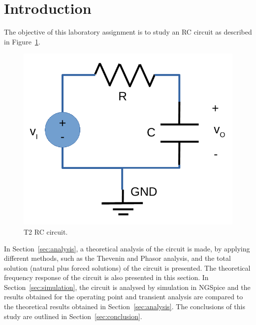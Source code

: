 \section{Introduction}
\label{sec:introduction}


The objective of this laboratory assignment is to study an RC circuit as described in Figure~\ref{fig:rc}.


\begin{figure}[h]
\centering
\includegraphics[width=0.4\linewidth]{../doc/rc.pdf}
\caption{T2 RC circuit.}
\label{fig:rc}
\end{figure}


In Section~\ref{sec:analysis}, a theoretical analysis of the circuit is made, by applying different methods, such as the Thevenin and Phasor analysis, and the total solution (natural plus forced solutions) of the circuit is presented. The theoretical frequency response of the circuit is also presented in this section. In Section~\ref{sec:simulation}, the circuit is analysed by simulation in NGSpice and the results obtained for the operating point and transient analysis are compared to the theoretical results obtained in Section~\ref{sec:analysis}. The conclusions of this study are outlined in Section~\ref{sec:conclusion}.
